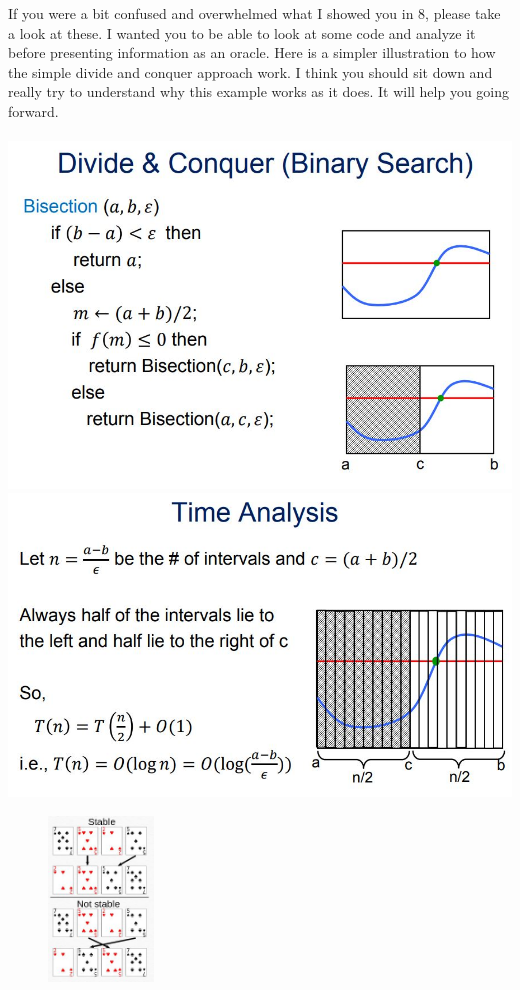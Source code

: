 \documentclass[12pt]{article}
\begin{document}
\noindent If you were a bit confused and overwhelmed what I showed you in 8, please take a look at these. I wanted you to be able to look at some code and analyze it before presenting information as an oracle. Here is a simpler illustration to how the simple divide and conquer approach work. I think you should sit down and really try to understand why this example works as it does. It will help you going forward.\\\\
\includegraphics[scale =0.5]{bs.jpg}\\
\includegraphics[scale =0.5]{bs2.jpg}\\
\newpage
\begin{figure}
    \centering
    \includegraphics[width=0.25\textwidth]{ssort.jpg}
\end{figure}
\end{document}
